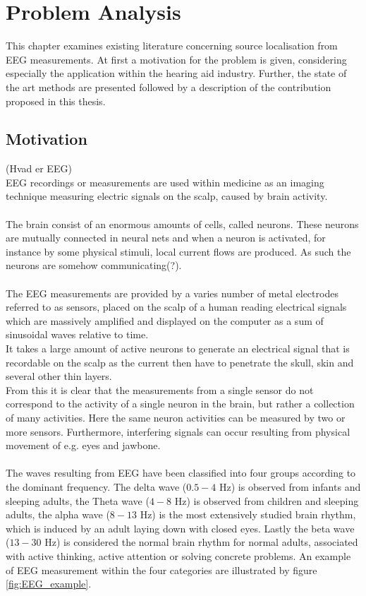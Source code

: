 \chapter{Problem Analysis}
This chapter examines existing literature concerning source localisation from EEG measurements. At first a motivation for the problem is given, considering especially the application within the hearing aid industry. Further, the state of the art methods are presented followed by a description of the contribution proposed in this thesis. 

\section{Motivation}
(Hvad er EEG)\\
EEG recordings or measurements are used within medicine as an imaging technique measuring electric signals on the scalp, caused by brain activity. \\
\\
The brain consist of an enormous amounts of cells, called neurons. These neurons are mutually connected in neural nets and when a neuron is activated, for instance by some physical stimuli, local current flows are produced\cite{fundamentalEEG}. As such the neurons are somehow communicating(?). \\
\\
The EEG measurements are provided by a varies number of metal electrodes referred to as sensors, placed on the scalp of a human reading electrical signals which are massively amplified and displayed on the computer as a sum of sinusoidal waves relative to time.\\
It takes a large amount of active neurons to generate an electrical signal that is recordable on the scalp as the current then have to penetrate the skull, skin and several other thin layers.  \\
From this it is clear that the measurements from a single sensor do not correspond to the activity of a single neuron in the brain, but rather a collection of many activities. Here the same neuron activities can be measured by two or more sensors. Furthermore, interfering signals can occur resulting from physical movement of e.g. eyes and jawbone\cite{fundamentalEEG}.\\
\\
The waves resulting from EEG have been classified into four groups according to the dominant frequency. The delta wave ($0.5-4$ Hz) is observed from infants and sleeping adults, the Theta wave ($4-8$ Hz) is observed from children and sleeping adults, the alpha wave ($8-13$ Hz) is the most extensively studied brain rhythm, which is induced by an adult laying down with closed eyes. Lastly the beta wave ($13-30$ Hz) is considered the normal brain rhythm for normal adults, associated with active thinking, active attention or solving concrete problems\cite[p. 11]{EEGsignalprocessing}. An example of EEG measurement within the four categories are illustrated by figure \ref{fig:EEG_example}.        
